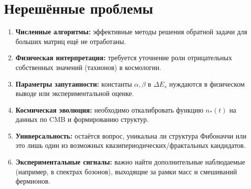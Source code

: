 \section{Нерешённые проблемы}
\begin{enumerate}
    \item \textbf{Численные алгоритмы:} эффективные методы решения обратной задачи для больших матриц ещё не отработаны.  
    \item \textbf{Физическая интерпретация:} требуется уточнение роли отрицательных собственных значений (тахионов) в космологии.  
    \item \textbf{Параметры запутанности:} константы $\alpha, \beta$ в $\Delta E_s$ нуждаются в физическом выводе или экспериментальной оценке.  
    \item \textbf{Космическая эволюция:} необходимо откалибровать функцию $n_*(t)$ на данных по CMB и формированию структур.  
    \item \textbf{Универсальность:} остаётся вопрос, уникальна ли структура Фибоначчи или это лишь один из возможных квазипериодических/фрактальных кандидатов.  
    \item \textbf{Экспериментальные сигналы:} важно найти дополнительные наблюдаемые (например, в спектрах бозонов), выходящие за рамки масс и смешиваний фермионов.  
\end{enumerate}
